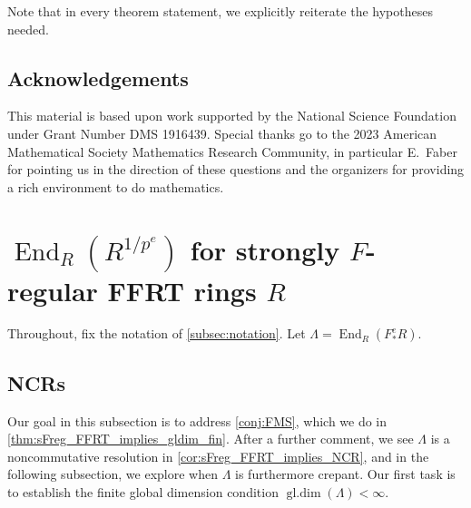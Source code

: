 \documentclass{amsart}
\theoremstyle{definition}
\DeclareMathOperator{\gldim}{\operatorname{gl.dim}}
\DeclareMathOperator{\End}{\operatorname{End}}
\newcommand{\Fe}{F_{*}^{e}}
\newcommand{\Rpe}{R^{1/p^{e}}}
\begin{document}
\bigbreak

Note that in every theorem statement, we explicitly reiterate the hypotheses needed.

\bigbreak

\subsection{Acknowledgements}

This material is based upon work supported by the National Science Foundation under Grant Number DMS 1916439. Special thanks go to the 2023 American Mathematical Society Mathematics Research Community, in particular E.\ Faber for pointing us in the direction of these questions and the organizers for providing a rich environment to do mathematics. 

\section{\texorpdfstring{$\End_{R}(\Rpe)$}{End\_R(R\^{}(1/p\^{}e))} for strongly \texorpdfstring{$F$}{F}-regular FFRT rings \texorpdfstring{$R$}{R}}\label{sec:sFreg_FFRT}

Throughout, fix the notation of \cref{subsec:notation}. Let $\Lambda=\End_{R}(\Fe R)$. 

\bigbreak

\subsection{NCRs}\label{subsec:sFreg_FFRT_NCR}

Our goal in this subsection is to address \cref{conj:FMS}, which we do in \cref{thm:sFreg_FFRT_implies_gldim_fin}. After a further comment, we see $\Lambda$ is a noncommutative resolution in \cref{cor:sFreg_FFRT_implies_NCR}, and in the following subsection, we explore when $\Lambda$ is furthermore crepant. Our first task is to establish the finite global dimension condition $\gldim(\Lambda)<\infty$.

\bigbreak
\end{document}
